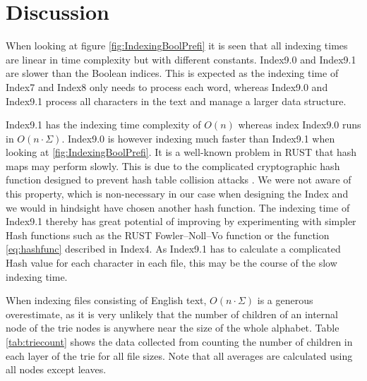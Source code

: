 \section{Discussion}
When looking at figure \ref{fig:IndexingBoolPrefi} it is seen that all indexing times are linear in time complexity but with different constants. Index9.0 and Index9.1 are slower than the Boolean indices. This is expected as the indexing time of Index7 and Index8 only needs to process each word, whereas Index9.0 and Index9.1 process all characters in the text and manage a larger data structure.

Index9.1 has the indexing time complexity of $O(n)$ whereas index Index9.0 runs in $O(n\cdot \Sigma)$. Index9.0 is however indexing much faster than Index9.1 when looking at \ref{fig:IndexingBoolPrefi}. It is a well-known problem in RUST that hash maps may perform slowly. This is due to the complicated cryptographic hash function designed to prevent hash table collision attacks \cite{RustLang}. We were not aware of this property, which is non-necessary in our case when designing the Index and we would in hindsight have chosen another hash function. The indexing time of Index9.1 thereby has great potential of improving by experimenting with simpler Hash functions such as the RUST Fowler–Noll–Vo function\cite{FNV} or the function \ref{eq:hashfunc} described in Index4. As Index9.1 has to calculate a complicated Hash value for each character in each file, this may be the course of the slow indexing time.

When indexing files consisting of English text, $O(n\cdot \Sigma)$ is a generous overestimate, as it is very unlikely that the number of children of an internal node of the trie nodes is anywhere near the size of the whole alphabet. Table \ref{tab:triecount} shows the data collected from counting the number of children in each layer of the trie for all file sizes. Note that all averages are calculated using all nodes except leaves. 

